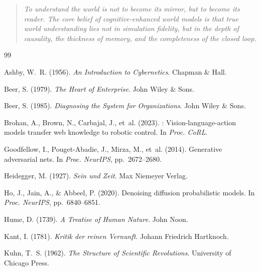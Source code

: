 \documentclass[11pt,a4paper]{article}
\begin{document}
\begin{quote}
\emph{To understand the world is not to become its mirror, but to become its reader. The core belief of cognitive-enhanced world models is that true world understanding lies not in simulation fidelity, but in the depth of causality, the thickness of memory, and the completeness of the closed loop.}
\end{quote}

\begin{thebibliography}{99}

Ashby, W.~R. (1956).
\newblock \emph{An Introduction to Cybernetics}.
\newblock Chapman \& Hall.

Beer, S. (1979).
\newblock \emph{The Heart of Enterprise}.
\newblock John Wiley \& Sons.

Beer, S. (1985).
\newblock \emph{Diagnosing the System for Organizations}.
\newblock John Wiley \& Sons.

Brohan, A., Brown, N., Carbajal, J., et~al. (2023).
: Vision-language-action models transfer web knowledge to robotic control.
\newblock In \emph{Proc. CoRL}.

Goodfellow, I., Pouget-Abadie, J., Mirza, M., et~al. (2014).
\newblock Generative adversarial nets.
\newblock In \emph{Proc. NeurIPS}, pp.~2672--2680.

Heidegger, M. (1927).
\newblock \emph{Sein und Zeit}.
\newblock Max Niemeyer Verlag.

Ho, J., Jain, A., \& Abbeel, P. (2020).
\newblock Denoising diffusion probabilistic models.
\newblock In \emph{Proc. NeurIPS}, pp.~6840--6851.

Hume, D. (1739).
\newblock \emph{A Treatise of Human Nature}.
\newblock John Noon.

Kant, I. (1781).
\newblock \emph{Kritik der reinen Vernunft}.
\newblock Johann Friedrich Hartknoch.

Kuhn, T.~S. (1962).
\newblock \emph{The Structure of Scientific Revolutions}.
\newblock University of Chicago Press.


\end{thebibliography}
\end{document}

